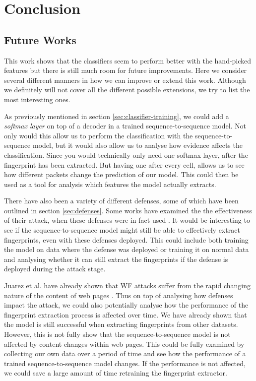 \chapter{Conclusion}


\section{Future Works} \label{sec:future-works}

This work shows that the classifiers seem to perform better with the hand-picked features but there is still much room for future improvements.
Here we consider several different manners in how we can improve or extend this work.
Although we definitely will not cover all the different possible extensions, we try to list the most interesting ones.

As previously mentioned in section \ref{sec:classifier-training}, we could add a \textit{softmax layer} on top of a decoder in a trained sequence-to-sequence model.
Not only would this allow us to perform the classification with the sequence-to-sequence model, but it would also allow us to analyse how evidence affects the classification.
Since you would technically only need one softmax layer, after the fingerprint has been extracted.
But having one after every cell, allows us to see how different packets change the prediction of our model.
This could then be used as a tool for analysis which features the model actually extracts.

There have also been a variety of different defenses, some of which have been outlined in section \ref{sec:defenses}.
Some works have examined the the effectiveness of their attack, when these defenses were in fact used \cite{kfingerprinting,wang_cai_johnson_nithyanand_goldberg_2014}.
It would be interesting to see if the sequence-to-sequence model might still be able to effectively extract fingerprints, even with these defenses deployed.
This could include both training the model on data where the defense was deployed or training it on normal data and analysing whether it can still extract the fingerprints if the defense is deployed during the attack stage.

Juarez et al. have already shown that WF attacks suffer from the rapid changing nature of the content of web pages \cite{wfpevaluation}.
Thus on top of analysing how defenses impact the attack, we could also potentially analyse how the performance of the fingerprint extraction process is affected over time.
We have already shown that the model is still successful when extracting fingerprints from other datasets. %
However, this is not fully show that the sequence-to-sequence model is not affected by content changes within web pages.
This could be fully examined by collecting our own data over a period of time and see how the performance of a trained sequence-to-sequence model changes.
If the performance is not affected, we could save a large amount of time retraining the fingerprint extractor.

